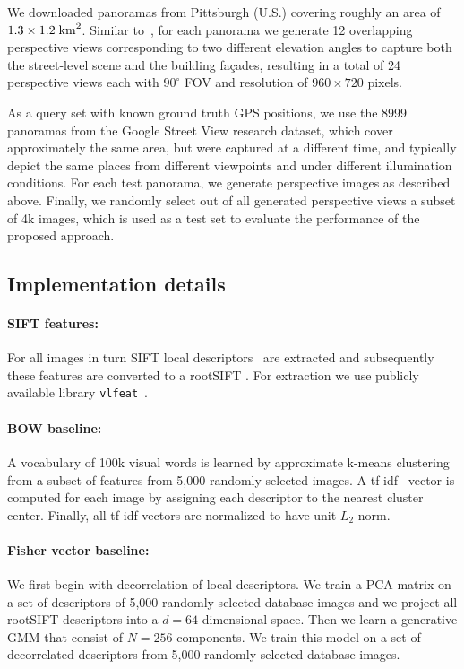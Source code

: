 \documentclass[table]{article} %
\begin{document}
		We downloaded panoramas from Pittsburgh (U.S.) covering roughly an area of $1.3 \times 1.2 \; {\rm km}^2$. Similar to~\cite{Chen11}, for each panorama we generate 12 overlapping perspective views corresponding to two different elevation angles to capture both the street-level scene and the building fa\c{c}ades, resulting in a total of 24 perspective views each with $90^\circ$ FOV and resolution of $960 \times 720$ pixels.

		As a query set with known ground truth GPS positions, we use the 8999 panoramas from the Google Street View research dataset, which cover approximately the same area, but were captured at a different time, and typically depict the same places from different viewpoints and under different illumination conditions. For each test panorama, we generate perspective images as described above. Finally, we randomly select out of all generated perspective views a subset of 4k images, which is used as a test set to evaluate the performance of the proposed approach.

   \subsection{Implementation details}
	   	\paragraph{SIFT features:}
	   		For all images in turn SIFT local descriptors~\cite{Lowe04} are extracted and subsequently these features are converted to a rootSIFT \cite{Arandjelovic12}. For extraction we use publicly available library {\tt vlfeat}~\cite{vlfeat}.
	    
	    \vspace{-4mm}
	   	\paragraph{BOW baseline:}	
	    	A vocabulary of 100k visual words is learned by approximate k-means clustering~\cite{Philbin07} from a subset of features from 5,000 randomly selected images. A tf-idf~\cite{Sivic2003} vector is computed for each image by assigning each descriptor to the nearest cluster center.  Finally, all tf-idf vectors are normalized to have unit $L_2$ norm.

	    \vspace{-4mm}
	    \paragraph{Fisher vector baseline:}
	    	We first begin with decorrelation of local descriptors. We train a PCA matrix on a set of descriptors of 5,000 randomly selected database images and we project all rootSIFT descriptors into a $d=64$ dimensional space. Then we learn a generative GMM that consist of $N=256$ components. We train this model on a set of decorrelated descriptors from 5,000 randomly selected database images.
\end{document}
